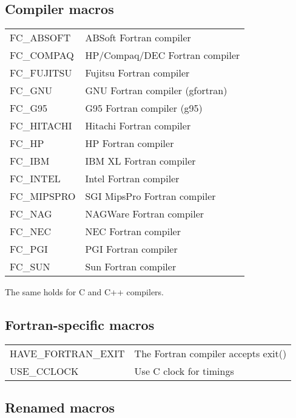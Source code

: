 \subsection{Compiler macros}

\begin{center}
\begin{tabular}{ll}
FC\_ABSOFT  & ABSoft Fortran compiler \tabularnewline
FC\_COMPAQ  & HP/Compaq/DEC Fortran compiler \tabularnewline
FC\_FUJITSU  & Fujitsu Fortran compiler \tabularnewline
FC\_GNU  & GNU Fortran compiler (gfortran) \tabularnewline
FC\_G95  & G95 Fortran compiler (g95) \tabularnewline
FC\_HITACHI  & Hitachi Fortran compiler \tabularnewline
FC\_HP  & HP Fortran compiler \tabularnewline
FC\_IBM  & IBM XL Fortran compiler \tabularnewline
FC\_INTEL  & Intel Fortran compiler \tabularnewline
FC\_MIPSPRO  & SGI MipsPro Fortran compiler \tabularnewline
FC\_NAG  & NAGWare Fortran compiler \tabularnewline
FC\_NEC  & NEC Fortran compiler \tabularnewline
FC\_PGI  & PGI Fortran compiler \tabularnewline
FC\_SUN  & Sun Fortran compiler \tabularnewline
\end{tabular}
\par\end{center}

The same holds for C and C++ compilers.


\subsection{Fortran-specific macros}

\begin{center}
\begin{tabular}{ll}
HAVE\_FORTRAN\_EXIT  & The Fortran compiler accepts exit() \tabularnewline
USE\_CCLOCK  & Use C clock for timings \tabularnewline
\end{tabular}
\par\end{center}


\subsection{Renamed macros}

